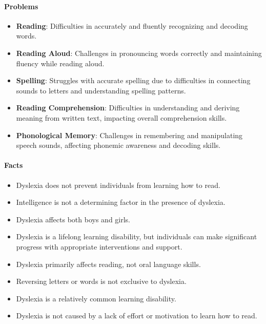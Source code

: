 \paragraph{\textbf{Problems}}
\begin{itemize}
    \item \textbf{Reading}: Difficulties in accurately and fluently recognizing and decoding words. \cite{dyslexiaCharAndSigns}
    \item \textbf{Reading Aloud}: Challenges in pronouncing words correctly and maintaining fluency while reading aloud. \cite{dyslexiaCharAndSigns}
    \item \textbf{Spelling}: Struggles with accurate spelling due to difficulties in connecting sounds to letters and understanding spelling patterns. \cite{dyslexiaCharAndSigns}
    \item \textbf{Reading Comprehension}: Difficulties in understanding and deriving meaning from written text, impacting overall comprehension skills.\cite{dyslexiaCharAndSigns}
    \item \textbf{Phonological Memory}: Challenges in remembering and manipulating speech sounds, affecting phonemic awareness and decoding skills. \cite{dyslexiaCharAndSigns}
\end{itemize}

\paragraph{\textbf{Facts}}
\begin{itemize}
    \item Dyslexia does not prevent individuals from learning how to read. \cite{dyslexiaCharAndSigns}
    \item Intelligence is not a determining factor in the presence of dyslexia. \cite{dyslexiaStatistics}
    \item Dyslexia affects both boys and girls. \cite{dyslexiaCharAndSigns}
    \item Dyslexia is a lifelong learning disability, but individuals can make significant progress with appropriate interventions and support. \cite{dyslexiaCharAndSigns}
    \item Dyslexia primarily affects reading, not oral language skills. \cite{dyslexiaCharAndSigns}
    \item Reversing letters or words is not exclusive to dyslexia. \cite{dyslexiaCharAndSigns}
    \item Dyslexia is a relatively common learning disability.
    \item Dyslexia is not caused by a lack of effort or motivation to learn how to read.
\end{itemize}

